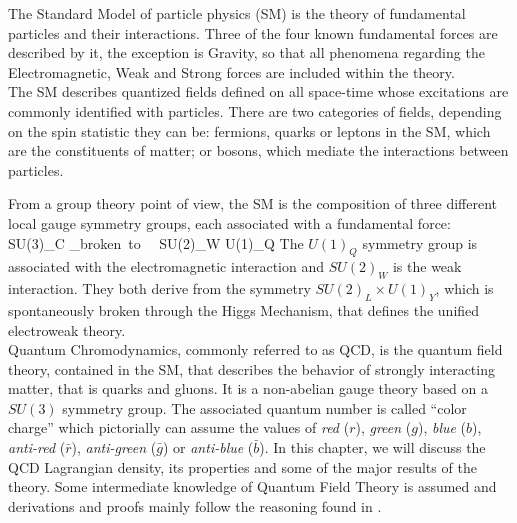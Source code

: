 The Standard Model of particle physics (SM) is the theory of fundamental particles and their interactions. Three of the four known fundamental forces are described by it, the exception is Gravity, so that all phenomena regarding the Electromagnetic, Weak and Strong forces are included within the theory. \\
The SM describes quantized fields defined on all space-time whose excitations are commonly identified with particles. There are two categories of fields, depending on the spin statistic they can be: fermions, quarks or leptons in the SM, which are the constituents of matter; or bosons, which mediate the interactions between particles.\\
\begin{center}
  
\end{center}
From a group theory point of view, the SM is the composition of three different local gauge symmetry groups, each associated with a fundamental force:
\beq
    SU(3)_C \times {}_{broken~to~~ SU(2)_W \times U(1)_{Q}}
\eeq
The $U(1)_{Q}$ symmetry group is associated with the electromagnetic interaction and $SU(2)_{W}$ is the weak interaction. They both derive from the symmetry $SU(2)_L \times U(1)_{Y}$, which is spontaneously broken through the Higgs Mechanism, that defines the unified electroweak theory. \\ 
Quantum Chromodynamics, commonly referred to as QCD, is the quantum field theory, contained in the SM, that describes the behavior of strongly interacting matter, that is quarks and gluons. It is a non-abelian gauge theory based on a $SU(3)$ symmetry group. The associated quantum number is called ``color charge'' which pictorially can assume the values of \textit{red} ($r$), \textit{green} ($g$), \textit{blue} ($b$), \textit{anti-red} ($\bar r$), \textit{anti-green} ($\bar g$) or \textit{anti-blue} ($\bar b$). In this chapter, we will discuss the QCD Lagrangian density, its properties and some of the major results of the theory. Some intermediate knowledge of Quantum Field Theory is assumed and derivations and proofs mainly follow the reasoning found in \cite{peskin}. 

